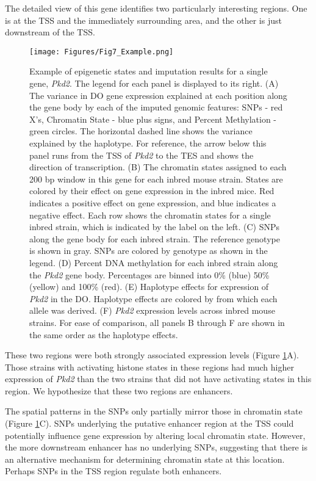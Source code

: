\documentclass[
  11pt,
]{article}
\begin{document}
The detailed view of this gene identifies two particularly interesting
regions. One is at the TSS and the immediately surrounding area, and the
other is just downstream of the TSS.

\begin{figure}[ht!]
\texttt{[image: Figures/Fig7\_Example.png]} 
\caption{Example of epigenetic states and imputation results for a single 
gene, \textit{Pkd2}. The legend for each panel is displayed to its right.
(A) The variance in DO gene expression explained at 
each position along the gene body by each of the imputed genomic 
features: SNPs - red X's, Chromatin State - blue plus signs, and 
Percent Methylation - green circles. The horizontal dashed line shows 
the variance explained by the haplotype. For reference, the arrow 
below this panel runs from the TSS of \textit{Pkd2} to the TES and 
shows the direction of transcription. (B) The chromatin states assigned 
to each 200 bp window in this gene for each inbred mouse strain. States 
are colored by their effect on gene expression in the inbred mice. Red 
indicates a positive effect on gene expression, and blue indicates a 
negative effect. Each row shows the chromatin states for a single inbred 
strain, which is indicated by the label on the left. (C) SNPs along the 
gene body for each inbred strain. The reference genotype is shown in gray. 
SNPs are colored by genotype as shown in the legend. (D) Percent DNA 
methylation for each inbred strain along the \textit{Pkd2} gene body. 
Percentages are binned into 0\% (blue) 50\% (yellow) and 100\% (red). 
(E) Haplotype effects for expression of \textit{Pkd2} in the DO. 
Haplotype effects are colored by from which each allele was derived. 
(F) \textit{Pkd2} expression levels across inbred mouse strains. For 
ease of comparison, all panels B through F are shown in the same order 
as the haplotype effects.}
\label{fig:example_gene}
\end{figure}

These two regions were both strongly associated expression levels
(Figure \ref{fig:example_gene}A). Those strains with activating histone
states in these regions had much higher expression of \textit{Pkd2} than
the two strains that did not have activating states in this region. We
hypothesize that these two regions are enhancers.

The spatial patterns in the SNPs only partially mirror those in
chromatin state (Figure \ref{fig:example_gene}C). SNPs underlying the
putative enhancer region at the TSS could potentially influence gene
expression by altering local chromatin state. However, the more
downstream enhancer has no underlying SNPs, suggesting that there is an
alternative mechanism for determining chromatin state at this location.
Perhaps SNPs in the TSS region regulate both enhancers.
\end{document}
